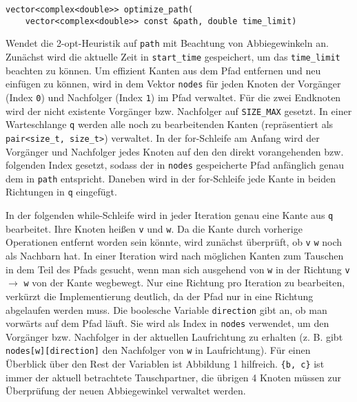 \documentclass[a4paper, 10pt, ngerman]{article}
\begin{document}
\verb|vector<complex<double>> optimize_path(| \\
\verb|    vector<complex<double>> const &path, double time_limit)|
\medskip

\noindent Wendet die 2-opt-Heuristik auf \verb|path| mit Beachtung von Abbiegewinkeln an. Zunächst wird die aktuelle Zeit in \verb|start_time| gespeichert, um das \verb|time_limit| beachten zu können. Um effizient Kanten aus dem Pfad entfernen und neu einfügen zu können, wird in dem Vektor \verb|nodes| für jeden Knoten der Vorgänger (Index \verb|0|) und Nachfolger (Index \verb|1|) im Pfad verwaltet. Für die zwei Endknoten wird der nicht existente Vorgänger bzw. Nachfolger auf \verb|SIZE_MAX| gesetzt. In einer Warteschlange \verb|q| werden alle noch zu bearbeitenden Kanten (repräsentiert als \verb|pair<size_t, size_t>|) verwaltet. In der for-Schleife am Anfang wird der Vorgänger und Nachfolger jedes Knoten auf den den direkt vorangehenden bzw. folgenden Index gesetzt, sodass der in \verb|nodes| gespeicherte Pfad anfänglich genau dem in \verb|path| entspricht. Daneben wird in der for-Schleife jede Kante in beiden Richtungen in \verb|q| eingefügt.

In der folgenden while-Schleife wird in jeder Iteration genau eine Kante aus \verb|q| bearbeitet. Ihre Knoten heißen \verb|v| und \verb|w|. Da die Kante durch vorherige Operationen entfernt worden sein könnte, wird zunächst überprüft, ob \verb|v| \verb|w| noch als Nachbarn hat. In einer Iteration wird nach möglichen Kanten zum Tauschen in dem Teil des Pfads gesucht, wenn man sich ausgehend von \verb|w| in der Richtung \verb|v| $\rightarrow$ \verb|w| von der Kante wegbewegt. Nur eine Richtung pro Iteration zu bearbeiten, verkürzt die Implementierung deutlich, da der Pfad nur in eine Richtung abgelaufen werden muss. Die boolesche Variable \verb|direction| gibt an, ob man vorwärts auf dem Pfad läuft. Sie wird als Index in \verb|nodes| verwendet, um den Vorgänger bzw. Nachfolger in der aktuellen Laufrichtung zu erhalten (z. B. gibt \verb|nodes[w][direction]| den Nachfolger von \verb|w| in Laufrichtung). Für einen Überblick über den Rest der Variablen ist Abbildung 1 hilfreich. \verb|{b, c}| ist immer der aktuell betrachtete Tauschpartner, die übrigen 4 Knoten müssen zur Überprüfung der neuen Abbiegewinkel verwaltet werden.
\end{document}

